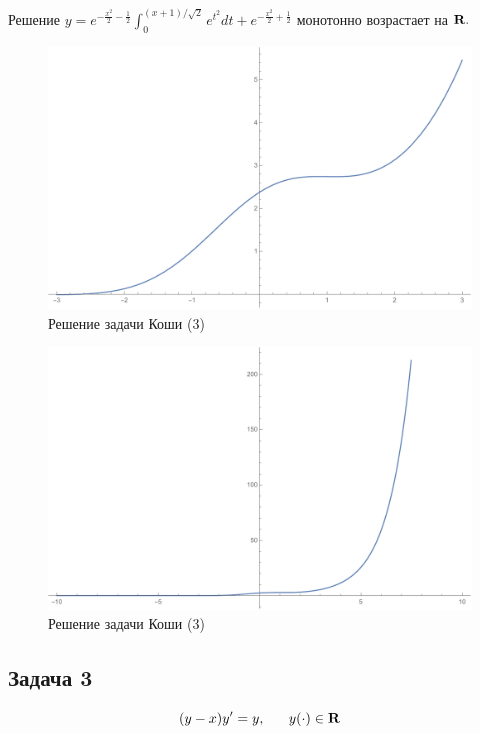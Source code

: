 \documentclass[a4paper, 12pt]{article}
\begin{document}
Решение $y =e^{-\frac{x^2} 2- \frac 1 2 } \int_{0}^{(x+1)/ \sqrt{2}} e^{t^2} dt+e^{-\frac{x^2} 2 +\frac 1 2 }$ монотонно возрастает на $\bf{R}.$

\begin{figure}[H]
	\centering
	\includegraphics[scale=0.7]{17}
	\caption{Решение задачи Коши (3)}
\end{figure}


\begin{figure}[H]
	\centering
	\includegraphics[scale=0.7]{12}
	\caption{Решение задачи Коши (3)}
\end{figure}

		\subsection {Задача 3}


\begin{equation}
(y-x)y'=y, \;\;\;\;\;\;y(\cdot) \in \bf{R}
\end{equation}
\end{document}
